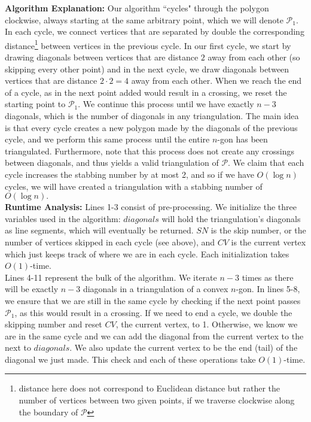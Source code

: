\documentclass[11pt]{article}
\begin{document}
\begin{enumerate}
    \textbf{Algorithm Explanation:} Our algorithm ``cycles" through the polygon clockwise, always starting at the same arbitrary point, which we will denote $\mathcal{P}_1$. In each cycle, we connect vertices that are separated by double the corresponding distance\footnote{distance here does not correspond to Euclidean distance but rather the number of vertices between two given points, if we traverse clockwise along the boundary of $\mathcal{P}$} between vertices in the previous cycle. In our first cycle, we start by drawing diagonals between vertices that are distance $2$ away from each other (so skipping every other point) and in the next cycle, we draw diagonals between vertices that are distance $2\cdot2 = 4$ away from each other. When we reach the end of a cycle, as in the next point added would result in a crossing, we reset the starting point to $\mathcal{P}_1$. We continue this process until we have exactly $n-3$ diagonals, which is the number of diagonals in any triangulation. The main idea is that every cycle creates a new polygon made by the diagonals of the previous cycle, and we perform this same process until the entire $n$-gon has been triangulated. Furthermore, note that this process does not create any crossings between diagonals, and thus yields a valid triangulation of $\mathcal{P}$. We claim that each cycle increases the stabbing number by at most 2, and so if we have $O(\log n)$ cycles, we will have created a triangulation with a stabbing number of $O(\log n).$\\
    
    \textbf{Runtime Analysis:} Lines 1-3 consist of pre-processing. We initialize the three variables used in the algorithm: $diagonals$ will hold the triangulation's diagonals as line segments, which will eventually be returned. $SN$ is the skip number, or the number of vertices skipped in each cycle (see above), and $CV$ is the current vertex which just keeps track of where we are in each cycle. Each initialization takes $O(1)$-time. \\ 

    Lines 4-11 represent the bulk of the algorithm. We iterate $n-3$ times as there will be exactly $n-3$ diagonals in a triangulation of a convex $n$-gon. In lines 5-8, we ensure that we are still in the same cycle by checking if the next point passes $\mathcal{P}_1$, as this would result in a crossing. If we need to end a cycle, we double the skipping number and reset $CV$, the current vertex, to 1. Otherwise, we know we are in the same cycle and we can add the diagonal from the current vertex to the next to $diagonals$. We also update the current vertex to be the end (tail) of the diagonal we just made. This check and each of these operations take $O(1)$-time.  \\


\end{enumerate}
\end{document}
